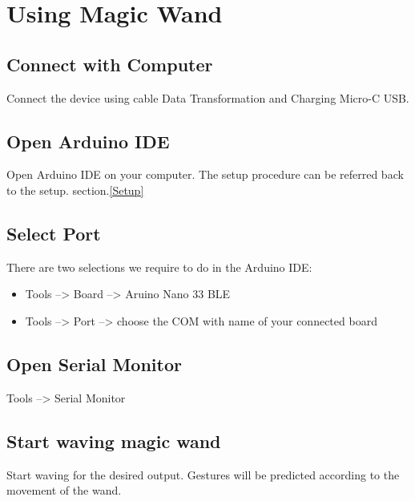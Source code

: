 %
%



\chapter{Using Magic Wand}

\section{Connect with Computer}
Connect the device using cable Data Transformation and Charging Micro-C USB.

\section{Open Arduino IDE}
Open Arduino IDE on your computer. The setup procedure can be referred back to the setup. section.\ref{Setup}

\section{Select Port}
There are two selections we require to do in the Arduino IDE:
\begin{itemize}
	\item Tools --> Board --> Aruino Nano 33 BLE
	\item Tools  --> Port --> choose the COM with name of your connected board
\end{itemize}

\section{Open Serial Monitor}
Tools --> Serial Monitor

\section{Start waving magic wand}
Start waving for the desired output. Gestures will be predicted according to the movement of the wand.
